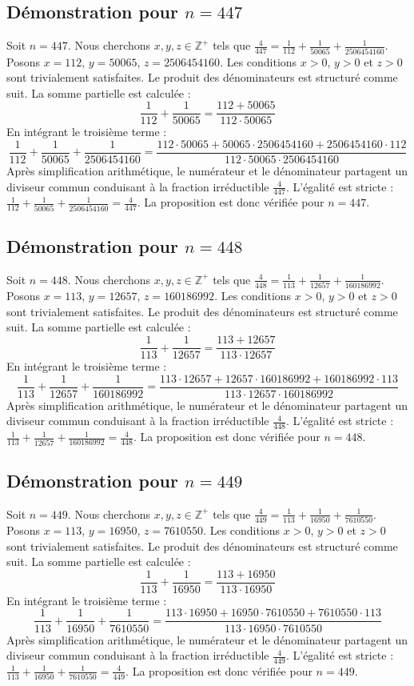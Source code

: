 \documentclass[11pt,a4paper]{article}
\begin{document}
\subsection{Démonstration pour $n = 447$}
Soit $n = 447$. Nous cherchons $x, y, z \in \mathbb{Z}^{+}$ tels que $\frac{4}{447} = \frac{1}{112} + \frac{1}{50065} + \frac{1}{2506454160}$.
Posons $x = 112$, $y = 50065$, $z = 2506454160$.
Les conditions $x > 0$, $y > 0$ et $z > 0$ sont trivialement satisfaites.
Le produit des dénominateurs est structuré comme suit. La somme partielle est calculée :
$$ \frac{1}{112} + \frac{1}{50065} = \frac{112+50065}{112 \cdot 50065} $$
En intégrant le troisième terme :
$$ \frac{1}{112} + \frac{1}{50065} + \frac{1}{2506454160} = \frac{112 \cdot 50065 + 50065 \cdot 2506454160 + 2506454160 \cdot 112}{112 \cdot 50065 \cdot 2506454160} $$
Après simplification arithmétique, le numérateur et le dénominateur partagent un diviseur commun conduisant à la fraction irréductible $\frac{4}{447}$.
L'égalité est stricte : $\frac{1}{112} + \frac{1}{50065} + \frac{1}{2506454160} = \frac{4}{447}$.
La proposition est donc vérifiée pour $n = 447$.
\subsection{Démonstration pour $n = 448$}
Soit $n = 448$. Nous cherchons $x, y, z \in \mathbb{Z}^{+}$ tels que $\frac{4}{448} = \frac{1}{113} + \frac{1}{12657} + \frac{1}{160186992}$.
Posons $x = 113$, $y = 12657$, $z = 160186992$.
Les conditions $x > 0$, $y > 0$ et $z > 0$ sont trivialement satisfaites.
Le produit des dénominateurs est structuré comme suit. La somme partielle est calculée :
$$ \frac{1}{113} + \frac{1}{12657} = \frac{113+12657}{113 \cdot 12657} $$
En intégrant le troisième terme :
$$ \frac{1}{113} + \frac{1}{12657} + \frac{1}{160186992} = \frac{113 \cdot 12657 + 12657 \cdot 160186992 + 160186992 \cdot 113}{113 \cdot 12657 \cdot 160186992} $$
Après simplification arithmétique, le numérateur et le dénominateur partagent un diviseur commun conduisant à la fraction irréductible $\frac{4}{448}$.
L'égalité est stricte : $\frac{1}{113} + \frac{1}{12657} + \frac{1}{160186992} = \frac{4}{448}$.
La proposition est donc vérifiée pour $n = 448$.
\subsection{Démonstration pour $n = 449$}
Soit $n = 449$. Nous cherchons $x, y, z \in \mathbb{Z}^{+}$ tels que $\frac{4}{449} = \frac{1}{113} + \frac{1}{16950} + \frac{1}{7610550}$.
Posons $x = 113$, $y = 16950$, $z = 7610550$.
Les conditions $x > 0$, $y > 0$ et $z > 0$ sont trivialement satisfaites.
Le produit des dénominateurs est structuré comme suit. La somme partielle est calculée :
$$ \frac{1}{113} + \frac{1}{16950} = \frac{113+16950}{113 \cdot 16950} $$
En intégrant le troisième terme :
$$ \frac{1}{113} + \frac{1}{16950} + \frac{1}{7610550} = \frac{113 \cdot 16950 + 16950 \cdot 7610550 + 7610550 \cdot 113}{113 \cdot 16950 \cdot 7610550} $$
Après simplification arithmétique, le numérateur et le dénominateur partagent un diviseur commun conduisant à la fraction irréductible $\frac{4}{449}$.
L'égalité est stricte : $\frac{1}{113} + \frac{1}{16950} + \frac{1}{7610550} = \frac{4}{449}$.
La proposition est donc vérifiée pour $n = 449$.
\end{document}
